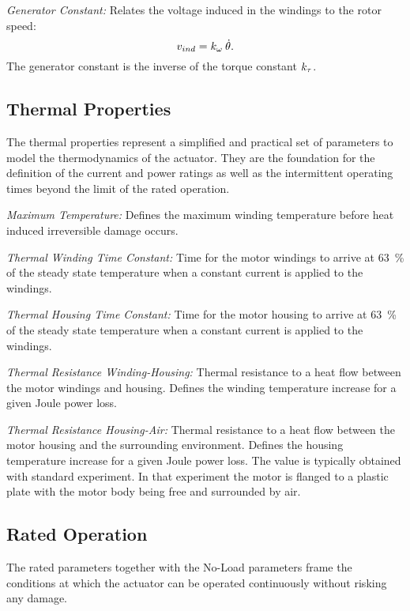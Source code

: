 \documentclass[a4paper,10pt]{cjtdsheet}      %
\begin{document}
\begin{multicols}{2}
\emph{Generator Constant:} Relates the voltage induced in the windings to the rotor speed:
\begin{equation}
	v_{ind} = k_\omega \: \dot{\theta}.
\end{equation}
The generator constant is the inverse of the torque constant $k_\tau$.

%
%
\subsection*{Thermal Properties}
The thermal properties represent a simplified and practical set of parameters to model the thermodynamics of the actuator. They are the foundation for the definition of the current and power ratings as well as the intermittent operating times beyond the limit of the rated operation.

\emph{Maximum Temperature:} Defines the maximum winding temperature before heat induced irreversible damage occurs.

\emph{Thermal Winding Time Constant:} Time for the motor windings to arrive at 63~\% of the steady state temperature when a constant current is applied to the windings.

\emph{Thermal Housing Time Constant:} Time for the motor housing to arrive at 63~\% of the steady state temperature when a constant current is applied to the windings.

\emph{Thermal Resistance Winding-Housing:} Thermal resistance to a heat flow between the motor windings and housing. Defines the winding temperature increase for a given Joule power loss.

\emph{Thermal Resistance Housing-Air:} Thermal resistance to a heat flow between the motor housing and the surrounding environment. Defines the housing temperature increase for a given Joule power loss. The value is typically obtained with standard experiment. In that experiment the motor is flanged to a plastic plate with the motor body being free and surrounded by air.

%
%
\subsection*{Rated Operation}
The rated parameters together with the No-Load parameters frame the conditions at which the actuator can be operated continuously without risking any damage.


\end{multicols}
\end{document}
